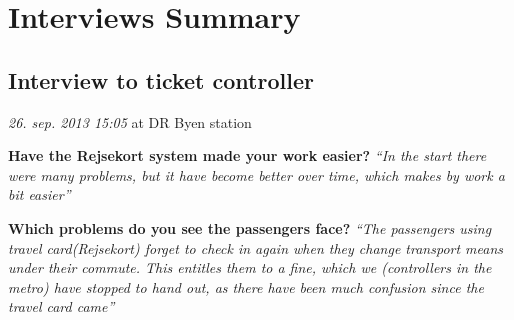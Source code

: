 \section*{Interviews Summary}

\subsection*{Interview to ticket controller}
\textit{26. sep. 2013 15:05} at DR Byen station

\textbf{Have the Rejsekort system made your work easier?}
\textit{“In the start there were many problems, but it have become better over time, which makes by work a bit easier”}

\textbf{Which problems do you see the passengers face?}
\textit{“The passengers using travel card(Rejsekort) forget to check in again when they change transport means under their commute. This entitles them to a fine, which we (controllers in the metro) have stopped to hand out, as there have been much confusion since the travel card came”}




